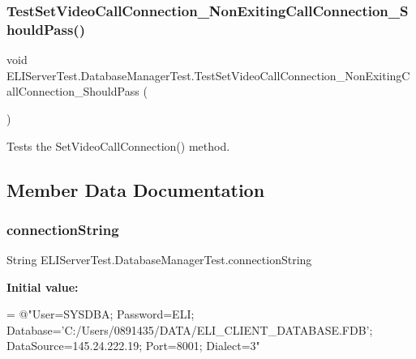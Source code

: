 \subsubsection{\texorpdfstring{Test\+Set\+Video\+Call\+Connection\+\_\+\+Non\+Exiting\+Call\+Connection\+\_\+\+Should\+Pass()}{TestSetVideoCallConnection\_NonExitingCallConnection\_ShouldPass()}}
{\footnotesize\ttfamily void E\+L\+I\+Server\+Test.\+Database\+Manager\+Test.\+Test\+Set\+Video\+Call\+Connection\+\_\+\+Non\+Exiting\+Call\+Connection\+\_\+\+Should\+Pass (\begin{DoxyParamCaption}{ }\end{DoxyParamCaption})\hspace{0.3cm}{\ttfamily [inline]}}



Tests the Set\+Video\+Call\+Connection() method. 



\subsection{Member Data Documentation}
\mbox{\label{class_e_l_i_server_test_1_1_database_manager_test_a1eb8c9f100072e4cfbfa18b045ec61b0}} 
\subsubsection{\texorpdfstring{connection\+String}{connectionString}}
{\footnotesize\ttfamily String E\+L\+I\+Server\+Test.\+Database\+Manager\+Test.\+connection\+String\hspace{0.3cm}{\ttfamily [private]}}

{\bfseries Initial value\+:}
\begin{DoxyCode}
= \textcolor{stringliteral}{@"User=SYSDBA;}
\textcolor{stringliteral}{                        Password=ELI;}
\textcolor{stringliteral}{                        Database='C:/Users/0891435/DATA/ELI\_CLIENT\_DATABASE.FDB';}
\textcolor{stringliteral}{                        DataSource=145.24.222.19;}
\textcolor{stringliteral}{                        Port=8001;}
\textcolor{stringliteral}{                        Dialect=3"}
\end{DoxyCode}
\mbox{\label{class_e_l_i_server_test_1_1_database_manager_test_a8ea046ca1fc628c89fd5337c1acf1576}} 
